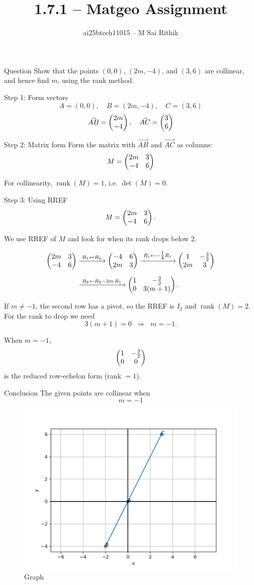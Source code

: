 \documentclass{beamer}
\title{1.7.1 -- Matgeo Assignment}
\author{ai25btech11015 -- M Sai Rithik}
\date{}
\begin{document}
\frame{\titlepage}

\begin{frame}{Question}
Show that the points \((0,0)\), \((2m,-4)\), and \((3,6)\) are collinear, and hence find \(m\), using the rank method.
\end{frame}

\begin{frame}{Step 1: Form vectors}
\[
A = (0,0), \quad B = (2m,-4), \quad C = (3,6)
\]
\[
\Vec{AB} = \begin{pmatrix}2m \\ -4\end{pmatrix}, 
\quad \Vec{AC} = \begin{pmatrix}3 \\ 6\end{pmatrix}
\]
\end{frame}

\begin{frame}{Step 2: Matrix form}
Form the matrix with \(\Vec{AB}\) and \(\Vec{AC}\) as columns:
\[
M = \begin{pmatrix}2m & 3 \\ -4 & 6\end{pmatrix}
\]

For collinearity, \(\operatorname{rank}(M) = 1\), i.e. \(\det(M) = 0\).
\end{frame}

\begin{frame}{Step 3: Using RREF}
\[
M=\begin{pmatrix}2m & 3\\ -4 & 6\end{pmatrix}.
\]

We use RREF of \(M\) and look for when its rank drops below \(2\).

\[
\begin{aligned}
\begin{pmatrix}2m & 3\\ -4 & 6\end{pmatrix}
&\xrightarrow{\;R_1 \leftrightarrow R_2\;}
\begin{pmatrix}-4 & 6\\ 2m & 3\end{pmatrix}
\xrightarrow{\;R_1\gets -\tfrac14 R_1\;}
\begin{pmatrix}1 & -\tfrac{3}{2}\\ 2m & 3\end{pmatrix}\\[6pt]
&\xrightarrow{\;R_2\gets R_2-2m\,R_1\;}
\begin{pmatrix}1 & -\tfrac{3}{2}\\ 0 & 3(m+1)\end{pmatrix}.
\end{aligned}
\]

If \(m\neq -1\), the second row has a pivot, so the RREF is \(I_2\) and \(\operatorname{rank}(M)=2\).  
For the rank to drop we need
\[
3(m+1)=0 \;\;\Rightarrow\;\; m=-1.
\]

When \(m=-1\),
\[
\begin{pmatrix}1 & -\tfrac{3}{2}\\ 0 & 0\end{pmatrix}
\]
is the reduced row-echelon form (rank \(=1\)).
\end{frame}

\begin{frame}{Conclusion}
The given points are collinear when
\[
\boxed{m = -1}
\]

\begin{figure}[h!]
    \centering
    \includegraphics[width=0.65\linewidth]{figs/fig.png}
    \caption{Graph}
\end{figure}
\end{frame}
\end{document}
